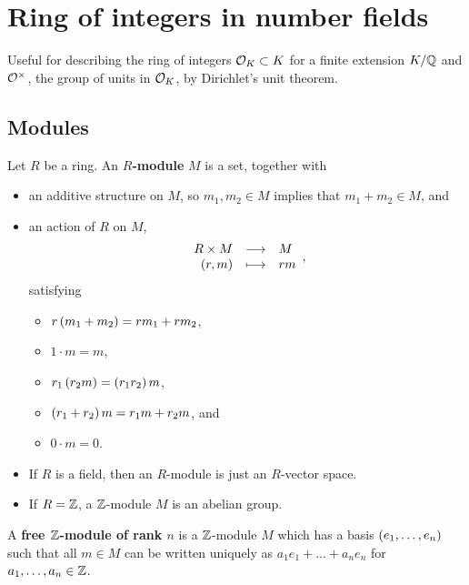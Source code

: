 \pagebreak

\section{Ring of integers in number fields}


Useful for describing the ring of integers $ \mathcal{O}_K \subset K $ for a finite extension $ K / \mathbb{Q} $ and $ \mathcal{O}^\times $, the group of units in $ \mathcal{O}_K $, by Dirichlet's unit theorem.

\subsection{Modules}

\begin{definition}
Let $ R $ be a ring. An \textbf{$ R $-module} $ M $ is a set, together with
\begin{itemize}
\item an additive structure on $ M $, so $ m_1, m_2 \in M $ implies that $ m_1 + m_2 \in M $, and
\item an action of $ R $ on $ M $,
$$ \function{R \times M}{M}{\br{r, m}}{rm}, $$
satisfying
\begin{itemize}
\item $ r\br{m_1 + m_2} = rm_1 + rm_2 $,
\item $ 1 \cdot m = m $,
\item $ r_1\br{r_2m} = \br{r_1r_2}m $,
\item $ \br{r_1 + r_2}m = r_1m + r_2m $, and
\item $ 0 \cdot m = 0 $.
\end{itemize}
\end{itemize}
\end{definition}

\begin{note*}
\hfill
\begin{itemize}
\item If $ R $ is a field, then an $ R $-module is just an $ R $-vector space.
\item If $ R = \mathbb{Z} $, a $ \mathbb{Z} $-module $ M $ is an abelian group.
\end{itemize}
\end{note*}

\begin{definition}
A \textbf{free $ \mathbb{Z} $-module of rank $ n $} is a $ \mathbb{Z} $-module $ M $ which has a basis $ \br{e_1, \dots, e_n} $ such that all $ m \in M $ can be written uniquely as $ a_1e_1 + \dots + a_ne_n $ for $ a_1, \dots, a_n \in \mathbb{Z} $.
\end{definition}

